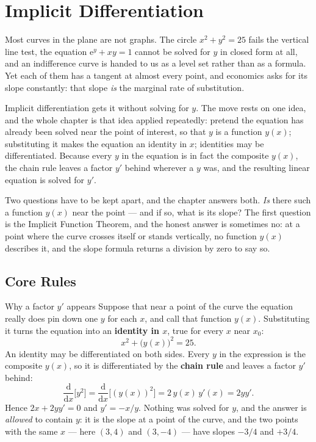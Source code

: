 \chapter{Implicit Differentiation}

Most curves in the plane are not graphs. The circle $x^{2}+y^{2}=25$ fails
the vertical line test, the equation $\mathrm{e}^{y}+xy=1$ cannot be solved
for $y$ in closed form at all, and an indifference curve is handed to us as
a level set rather than as a formula. Yet each of them has a tangent at
almost every point, and economics asks for its slope constantly: that slope
\emph{is} the marginal rate of substitution.

Implicit differentiation gets it without solving for $y$. The move rests on
one idea, and the whole chapter is that idea applied repeatedly: pretend the
equation has already been solved near the point of interest, so that $y$ is
a function $y(x)$; substituting it makes the equation an identity in $x$;
identities may be differentiated. Because every $y$ in the equation is in fact the
composite $y(x)$, the chain rule leaves a factor $y'$ behind wherever a $y$
was, and the resulting linear equation is solved for $y'$.

Two questions have to be kept apart, and the chapter answers both. \emph{Is}
there such a function $y(x)$ near the point --- and if so, what is its
slope? The first question is the Implicit Function Theorem, and the honest
answer is sometimes no: at a point where the curve crosses itself or stands
vertically, no function $y(x)$ describes it, and the slope formula returns a
division by zero to say so.

\section{Core Rules}

\begin{rulebox}{Why a factor $y'$ appears}
Suppose that near a point of the curve the equation really does pin down one
$y$ for each $x$, and call that function $y(x)$. Substituting it turns the
equation into an \textbf{identity in $x$}, true for every $x$ near $x_{0}$:
\[
  x^{2}+\bigl(y(x)\bigr)^{2}=25 .
\]
An identity may be differentiated on both sides. Every $y$ in the expression
is the composite $y(x)$, so it is differentiated by the \textbf{chain rule}
and leaves a factor $y'$ behind:
\[
  \frac{\mathrm{d}}{\mathrm{d}x}\bigl[y^{2}\bigr]
  =\frac{\mathrm{d}}{\mathrm{d}x}\bigl[(y(x))^{2}\bigr]
  =2\,y(x)\,y'(x)=2yy' .
\]
Hence $2x+2yy'=0$ and $y'=-x/y$. Nothing was solved for $y$, and the answer
is \emph{allowed} to contain $y$: it is the slope at a point of the curve,
and the two points with the same $x$ --- here $(3,4)$ and $(3,-4)$ --- have
slopes $-3/4$ and $+3/4$.
\end{rulebox}

